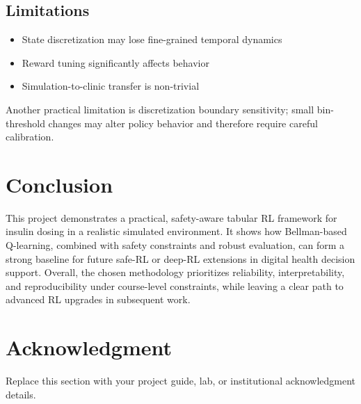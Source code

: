 \documentclass[conference]{IEEEtran}
\begin{document}
\subsection{Limitations}
\begin{itemize}
    \item State discretization may lose fine-grained temporal dynamics
    \item Reward tuning significantly affects behavior
    \item Simulation-to-clinic transfer is non-trivial
\end{itemize}
Another practical limitation is discretization boundary sensitivity; small bin-threshold changes may alter policy behavior and therefore require careful calibration.

\section{Conclusion}
This project demonstrates a practical, safety-aware tabular RL framework for insulin dosing in a realistic simulated environment. It shows how Bellman-based Q-learning, combined with safety constraints and robust evaluation, can form a strong baseline for future safe-RL or deep-RL extensions in digital health decision support.
Overall, the chosen methodology prioritizes reliability, interpretability, and reproducibility under course-level constraints, while leaving a clear path to advanced RL upgrades in subsequent work.

\section*{Acknowledgment}
Replace this section with your project guide, lab, or institutional acknowledgment details.
\end{document}
